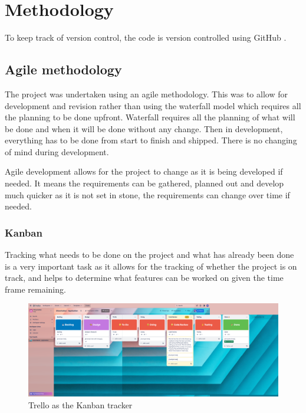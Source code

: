 \chapter{Methodology}

To keep track of version control, the code is version controlled using GitHub \cite{dissertaiton_github}.

\section{Agile methodology}

The project was undertaken using an agile methodology. This was to allow for development and revision rather than using the waterfall model which requires all the planning to be done upfront. Waterfall requires all the planning of what will be done and when it will be done without any change. Then in development, everything has to be done from start to finish and shipped. There is no changing of mind during development.

Agile development allows for the project to change as it is being developed if needed. It means the requirements can be gathered, planned out and develop much quicker as it is not set in stone, the requirements can change over time if needed.

\subsection{Kanban}

Tracking what needs to be done on the project and what has already been done is a very important task as it allows for the tracking of whether the project is on track, and helps to determine what features can be worked on given the time frame remaining.

\begin{figure}[H]
    \centering
    \includegraphics[scale=0.15]{images/starting trello.png}
    \caption{Trello as the Kanban tracker}
    \label{fig:my_label}
\end{figure}


